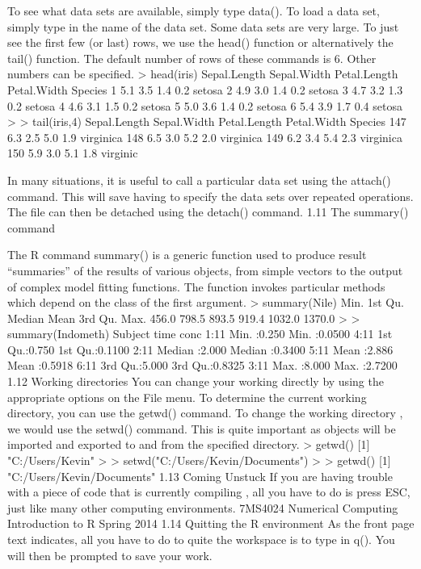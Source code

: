 \documentclass{beamer}
\begin{document}
\begin{frame}


To see what data sets are available, simply type data(). To load a data set, simply type in the
name of the data set. Some data sets are very large. To just see the first few (or last) rows, we
use the head() function or alternatively the tail() function. The default number of rows of
these commands is 6. Other numbers can be specified.
> head(iris)
Sepal.Length Sepal.Width Petal.Length Petal.Width Species
1 5.1 3.5 1.4 0.2 setosa
2 4.9 3.0 1.4 0.2 setosa
3 4.7 3.2 1.3 0.2 setosa
4 4.6 3.1 1.5 0.2 setosa
5 5.0 3.6 1.4 0.2 setosa
6 5.4 3.9 1.7 0.4 setosa
>
> tail(iris,4)
Sepal.Length Sepal.Width Petal.Length Petal.Width Species
147 6.3 2.5 5.0 1.9 virginica
148 6.5 3.0 5.2 2.0 virginica
149 6.2 3.4 5.4 2.3 virginica
150 5.9 3.0 5.1 1.8 virginic
\end{frame}
\begin{frame}
In many situations, it is useful to call a particular data set using the attach() command. This
will save having to specify the data sets over repeated operations. The file can then be detached
using the detach() command.
1.11 The summary() command

\end{frame}
\begin{frame}

The R command summary() is a generic function used to produce result “summaries” of the
results of various objects, from simple vectors to the output of complex model fitting functions.
The function invokes particular methods which depend on the class of the first argument.
> summary(Nile)
Min. 1st Qu. Median Mean 3rd Qu. Max.
456.0 798.5 893.5 919.4 1032.0 1370.0
>
> summary(Indometh)
Subject time conc
1:11 Min. :0.250 Min. :0.0500
4:11 1st Qu.:0.750 1st Qu.:0.1100
2:11 Median :2.000 Median :0.3400
5:11 Mean :2.886 Mean :0.5918
6:11 3rd Qu.:5.000 3rd Qu.:0.8325
3:11 Max. :8.000 Max. :2.7200
1.12 Working directories
You can change your working directly by using the appropriate options on the File menu. To
determine the current working directory, you can use the getwd() command. To change the
working directory , we would use the setwd() command. This is quite important as objects
will be imported and exported to and from the specified directory.
> getwd()
[1] "C:/Users/Kevin"
>
> setwd("C:/Users/Kevin/Documents")
>
> getwd()
[1] "C:/Users/Kevin/Documents"
1.13 Coming Unstuck
If you are having trouble with a piece of code that is currently compiling , all you have to do
is press ESC, just like many other computing environments.
7MS4024 Numerical Computing Introduction to R Spring 2014
1.14 Quitting the R environment
As the front page text indicates, all you have to do to quite the workspace is to type in q().
You will then be prompted to save your work.
\end{frame}
\end{document}
